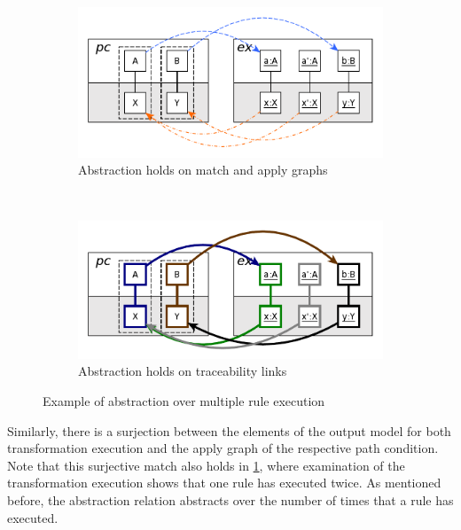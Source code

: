 \begin{figure}[htb]
        \centering
        \begin{subfigure}[b]{0.40\textwidth}
                \centering
                \includegraphics[width=1\textwidth]{./figures/abstraction_relation/non_overlapping2.pdf}
               	\caption{Abstraction holds on match and apply graphs}
               	\label{fig:non_overlapping2_match_apply}
        \end{subfigure}%
        ~~\\
        \begin{subfigure}[b]{0.40\textwidth}
                \centering
                \includegraphics[width=1\textwidth]{./figures/abstraction_relation/non_overlapping2_trace_links.pdf}
                \caption{Abstraction holds on traceability links}
                \label{fig:non_overlapping2_trace_links}
        \end{subfigure}%
        \caption{Example of abstraction over multiple rule execution}
        \label{fig:non_overlapping2}
\end{figure}

Similarly, there is a surjection between the elements of the output model for both transformation execution and the apply graph of the respective path condition. Note that this surjective match also holds in \cref{fig:non_overlapping2_match_apply}, where examination of the transformation execution shows that one rule has executed twice. As mentioned before, the abstraction relation abstracts over the number of times that a rule has executed.


